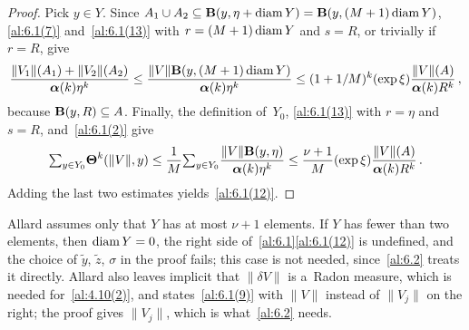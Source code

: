 \begin{proof}
    Pick $y \in Y$. Since $A_1 \cup A_2 \subseteq \mathbf{B}(y,\eta + \operatorname{diam} Y) = \mathbf{B}(y,(M+1)
    \operatorname{diam} Y)$, \ref{al:6.1(7)} and~\eqref{al:6.1(13)} with $r = (M+1) \operatorname{diam} Y$ and $s = R$, or
    trivially if $r = R$, give
    \begin{displaymath}
        \frac{\|V_1\|(A_1) + \|V_2\|(A_2)}{\boldsymbol{\alpha}(k) \eta^{k}} \le \frac{\|V\|
        \mathbf{B}(y,(M+1) \operatorname{diam} Y)}{\boldsymbol{\alpha}(k) \eta^{k}} \le (1 + 1/M)^{k} (\exp
        \xi) \frac{\|V\|(A)}{\boldsymbol{\alpha}(k) R^{k}} \,,
    \end{displaymath}
    because $\mathbf{B}(y,R) \subseteq A$. Finally, the definition of~$Y_0$, \eqref{al:6.1(13)}
    with $r = \eta$ and $s = R$, and~\ref{al:6.1(2)} give
    \begin{displaymath}
        {\textstyle\sum_{y \in Y_0}^{}} \boldsymbol{\Theta}^{k}(\|V\|,y) \le \frac{1}{M} {\textstyle\sum_{y \in Y_0}^{}}
        \frac{\|V\| \mathbf{B}(y,\eta)}{\boldsymbol{\alpha}(k) \eta^{k}} \le \frac{\nu + 1}{M} (\exp
        \xi) \frac{\|V\|(A)}{\boldsymbol{\alpha}(k) R^{k}} \,.
    \end{displaymath}
    Adding the last two estimates yields~\ref{al:6.1(12)}.
\end{proof}

\begin{remark}
    \label{rem:6.1}
    Allard assumes only that $Y$ has at most $\nu + 1$ elements. If $Y$ has fewer than two
    elements, then $\operatorname{diam} Y = 0$, the right side of~\ref{al:6.1}\ref{al:6.1(12)} is undefined, and
    the choice of $\tilde y$, $\tilde z$, $\sigma$ in the proof fails; this case is not needed,
    since~\ref{al:6.2} treats it directly. Allard also leaves implicit that $\|\delta V\|$ is
    a~Radon measure, which is needed for~\ref{al:4.10(2)}, and states~\ref{al:6.1(9)} with $\|V\|$
    instead of $\|V_j\|$ on the right; the proof gives $\|V_j\|$, which is what~\ref{al:6.2} needs.
\end{remark}

